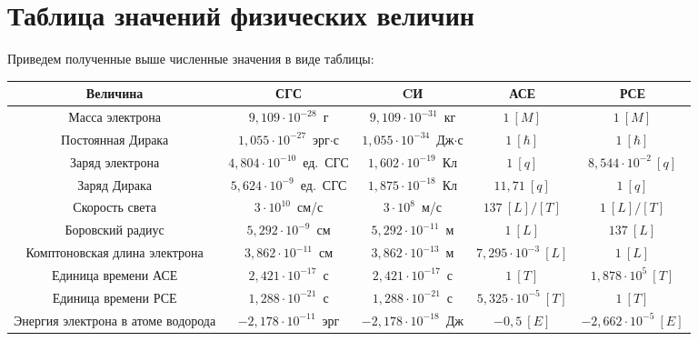\section{Таблица значений физических величин}
  Приведем полученные выше численные значения в виде таблицы:
  \begin{table}[h!]
    \center
    \small
    \begin{tabular}{|*{5}{C{.18}|}} \hline
        \textbf{Величина} & \textbf{СГС} & \textbf{CИ} & \textbf{АСЕ} &
          \textbf{РСЕ} \\ \hline
        Масса электрона & \( 9,\!109 \cdot 10^{-28} \)~г &
          \( 9,\!109 \cdot 10^{-31} \)~кг & \( 1~[M] \) & \( 1~[M] \) \\ \hline
        Постоянная Дирака & \( 1,\!055 \cdot 10^{-27} \)~эрг\( \cdot \)с &
          \( 1,\!055 \cdot 10^{-34} \)~Дж\( \cdot \)с & \( 1~[\hbar] \) &
          \( 1~[\hbar] \) \\ \hline
        Заряд электрона & \( 4,\!804 \cdot 10^{-10} \)~ед.~СГС &
          \( 1,\!602 \cdot 10^{-19} \)~Кл & \( 1~[q] \) &
          \( 8,\!544 \cdot 10^{-2}~[q] \) \\ \hline
        Заряд Дирака & \( 5,\!624 \cdot 10^{-9} \)~ед.~СГС &
          \( 1,\!875 \cdot 10^{-18} \)~Кл & \( 11,\!71~[q] \) &
          \( 1~[q] \) \\ \hline
        Скорость света & \( 3 \cdot 10^{10} \)~см/с & \( 3 \cdot 10^{8} \)~м/с &
          \( 137~[L]/[T] \) & \( 1~[L]/[T] \) \\ \hline
        Боровский радиус & \( 5,\!292 \cdot 10^{-9} \)~см &
          \( 5,\!292 \cdot 10^{-11} \)~м & \( 1~[L] \) &
          \( 137~[L] \) \\ \hline
        Комптоновская длина электрона & \( 3,\!862 \cdot 10^{-11} \)~см &
          \( 3,\!862 \cdot 10^{-13} \)~м & \( 7,\!295 \cdot 10^{-3}~[L] \) &
          \( 1~[L] \) \\ \hline
        Единица времени АСЕ & \( 2,\!421 \cdot 10^{-17} \)~с &
          \( 2,\!421 \cdot 10^{-17} \)~с & \( 1~[T] \) &
          \( 1,\!878 \cdot 10^5~[T] \) \\ \hline
        Единица времени РСЕ & \( 1,\!288 \cdot 10^{-21} \)~с &
          \( 1,\!288 \cdot 10^{-21} \)~с & \( 5,\!325 \cdot 10^{-5}~[T] \) &
          \( 1~[T] \) \\ \hline
        Энергия электрона в атоме водорода & \( -2,\!178 \cdot 10^{-11} \)~эрг &
          \( -2,\!178 \cdot 10^{-18} \)~Дж & \( -0,\!5~[E] \) &
          \( -2,\!662 \cdot 10^{-5}~[E] \) \\ \hline

\end{tabular}
\end{table}
